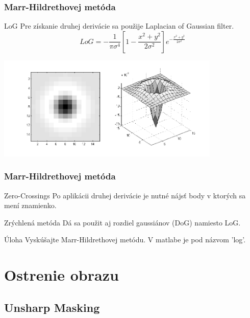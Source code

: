 \documentclass{beamer}
\begin{document}
\begin{frame}
\frametitle{Marr-Hildrethovej metóda}
  \begin{block}{LoG}
  Pre získanie druhej derivácie sa použije Laplacian of Gaussian filter.
  \begin{equation*}
  LoG = -\frac{1}{\pi \sigma^4} \left[ 1 - \frac{x^2 + y^2}{2\sigma^2} \right] e^{-\frac{x^2+y^2}{2\sigma^2}}
  \end{equation*}  
  \end{block}
    
  \begin{center}
  \includegraphics[width=0.8\textwidth]{laplacian_of_gaussian.png}
  \end{center}
\end{frame}

\begin{frame}
\frametitle{Marr-Hildrethovej metóda}
  \begin{block}{Zero-Crossings}
  Po aplikácii druhej derivácie je nutné nájsť body v ktorých sa mení znamienko.
  \end{block}

  \begin{block}{Zrýchlená metóda}
  Dá sa použit aj rozdiel gaussiánov (DoG) namiesto LoG.
  \end{block}   
  
  \begin{block}{Úloha}
  Vyskúšajte Marr-Hildrethovej metódu. V matlabe je pod názvom 'log'.
  \end{block}     
\end{frame}

\section{Ostrenie obrazu}
\subsection{Unsharp Masking}
\end{document}
